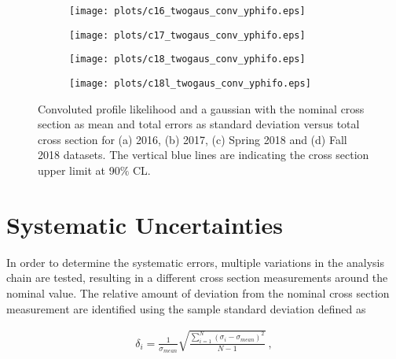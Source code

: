 \begin{center}
\null
\vfill
\begin{figure}[H]
    \centering
    \begin{subfigure}[b]{0.49\textwidth}
        \texttt{[image: plots/c16\_twogaus\_conv\_yphifo.eps]}
        \caption{}
        \label{fig.y2175.xsec_ul.yphifo.2.a}
    \end{subfigure}
    \begin{subfigure}[b]{0.49\textwidth}
        \texttt{[image: plots/c17\_twogaus\_conv\_yphifo.eps]}
        \caption{}
        \label{fig.y2175.xsec_ul.yphifo.2.b}
    \end{subfigure}
    \begin{subfigure}[b]{0.49\textwidth}
        \texttt{[image: plots/c18\_twogaus\_conv\_yphifo.eps]}
        \caption{}
        \label{fig.y2175.xsec_ul.yphifo.2.c}
    \end{subfigure}
    \begin{subfigure}[b]{0.49\textwidth}
        \texttt{[image: plots/c18l\_twogaus\_conv\_yphifo.eps]}
        \caption{}
        \label{fig.y2175.xsec_ul.yphifo.2.d}
    \end{subfigure}
    \caption{Convoluted profile likelihood and a gaussian with the nominal cross section as mean and total errors as standard deviation versus total cross section for (a) 2016, (b) 2017, (c) Spring 2018 and (d) Fall 2018 datasets. The vertical blue lines are indicating the cross section upper limit at 90$\%$ CL.}
    \label{fig.y2175.xsec_ul.yphifo.2}
\end{figure}
\null
\vfill
\end{center}

\section{Systematic Uncertainties}
\label{chap.y2175.syserr}

In order to determine the systematic errors, multiple variations in the analysis chain are tested, resulting in a different cross section measurements around the nominal value. The relative amount of deviation from the nominal cross section measurement are identified using the sample standard deviation defined as

\begin{equation}
    \label{eq.y2175.syserr.4.5}
    \begin{aligned}
        \delta_{i} = \frac{1}{\sigma_{mean}} \sqrt{\frac{\sum\limits_{i=1}^{N} (\sigma_{i} - \sigma_{mean})^2}{N-1}}~,\\
    \end{aligned}
\end{equation}

